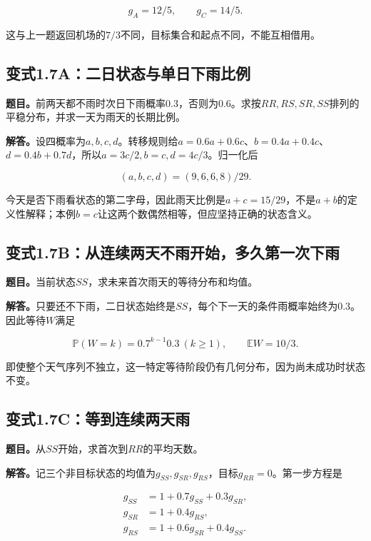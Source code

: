 \documentclass[
  11pt,a4paper,UTF8,fontset=fandol]{ctexart}
\begin{document}
\[\boxed{g_A=12/5,\qquad g_C=14/5.}\]

这与上一题返回机场的\(7/3\)不同，目标集合和起点不同，不能互相借用。

\subsection{变式1.7A：二日状态与单日下雨比例}\label{ux53d8ux5f0f1.7aux4e8cux65e5ux72b6ux6001ux4e0eux5355ux65e5ux4e0bux96e8ux6bd4ux4f8b}

\textbf{题目。}前两天都不雨时次日下雨概率\(0.3\)，否则为\(0.6\)。求按\(RR,RS,SR,SS\)排列的平稳分布，并求一天为雨天的长期比例。

\textbf{解答。}设四概率为\(a,b,c,d\)。转移规则给\(a=0.6a+0.6c\)、\(b=0.4a+0.4c\)、\(d=0.4b+0.7d\)，所以\(a=3c/2,b=c,d=4c/3\)。归一化后

\[\boxed{(a,b,c,d)=(9,6,6,8)/29.}\]

今天是否下雨看状态的第二字母，因此雨天比例是\(a+c=15/29\)，不是\(a+b\)的定义性解释；本例\(b=c\)让这两个数偶然相等，但应坚持正确的状态含义。

\subsection{变式1.7B：从连续两天不雨开始，多久第一次下雨}\label{ux53d8ux5f0f1.7bux4eceux8fdeux7eedux4e24ux5929ux4e0dux96e8ux5f00ux59cbux591aux4e45ux7b2cux4e00ux6b21ux4e0bux96e8}

\textbf{题目。}当前状态\(SS\)，求未来首次雨天的等待分布和均值。

\textbf{解答。}只要还不下雨，二日状态始终是\(SS\)，每个下一天的条件雨概率始终为\(0.3\)。因此等待\(W\)满足

\[\boxed{\mathbb P(W=k)=0.7^{k-1}0.3\ (k\ge1),\qquad\mathbb EW=10/3.}\]

即使整个天气序列不独立，这一特定等待阶段仍有几何分布，因为尚未成功时状态不变。

\subsection{变式1.7C：等到连续两天雨}\label{ux53d8ux5f0f1.7cux7b49ux5230ux8fdeux7eedux4e24ux5929ux96e8}

\textbf{题目。}从\(SS\)开始，求首次到\(RR\)的平均天数。

\textbf{解答。}记三个非目标状态的均值为\(g_{SS},g_{SR},g_{RS}\)，目标\(g_{RR}=0\)。第一步方程是

\[
\begin{aligned}
g_{SS}&=1+0.7g_{SS}+0.3g_{SR},\\
g_{SR}&=1+0.4g_{RS},\\
g_{RS}&=1+0.6g_{SR}+0.4g_{SS}.
\end{aligned}
\]
\end{document}
